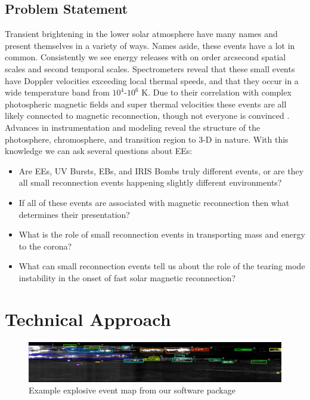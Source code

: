 \documentclass[]{aastex6}
\begin{document}
	
	
	\subsection{Problem Statement} 
	Transient brightening in the lower solar atmosphere have many names and present themselves in a variety of ways. Names aside, these events have a lot in common.  Consistently we see energy releases with on order arcsecond spatial scales and second temporal scales. Spectrometers reveal that these small events have Doppler velocities exceeding local thermal speeds, and that they occur in a wide temperature band from $10^4$-$10^6$ K.  Due to their correlation with complex photospheric magnetic fields and super thermal velocities these events are all likely connected to magnetic reconnection, though not everyone is convinced \citep{Judge2015}. Advances in instrumentation and modeling reveal the structure of the photosphere, chromosphere, and transition region to 3-D in nature.  With this knowledge we can ask several questions about EEs:
	
		\begin{itemize}
	
			\item Are EEs, UV Bursts, EBs, and IRIS Bombs truly different events, or are they all small reconnection events happening slightly different environments?
			\item If all of these events are associated with magnetic reconnection then what determines their presentation?
			\item What is the role of small reconnection events in transporting mass and energy to the corona?
			\item What can small reconnection events tell us about the role of the tearing mode instability in the onset of fast solar magnetic reconnection?
			
			
		\end{itemize}
		
	

\section{Technical Approach} 


\begin{figure}
	\label{fig:eemap}
	\caption{Example explosive event map from our software package}
	\centerline{\includegraphics[scale=.5]{./NESSF_img/ee_map.eps}}
	
\end{figure}
\end{document}
